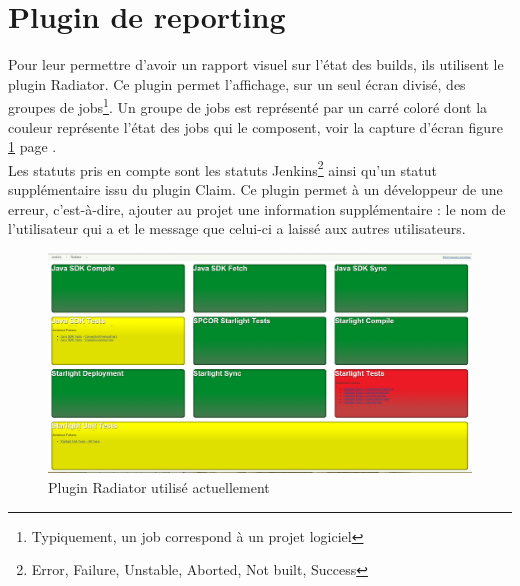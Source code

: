 \section{Plugin de reporting}
Pour leur permettre d'avoir un rapport visuel sur l'état des builds, ils utilisent le plugin Radiator. Ce plugin permet l'affichage, sur un seul écran divisé, des groupes de jobs\footnote{Typiquement, un job correspond à un projet logiciel}. Un groupe de jobs est représenté par un carré coloré dont la couleur représente l'état des jobs qui le composent, voir la capture d'écran figure \ref{figure:radiatorActual} page \pageref{figure:radiatorActual}.\\
Les statuts pris en compte sont les statuts Jenkins\footnote{Error, Failure, Unstable, Aborted, Not built, Success} ainsi qu'un statut supplémentaire issu du plugin Claim. Ce plugin permet à un développeur de  une erreur, c'est-à-dire, ajouter au projet une information supplémentaire : le nom de l'utilisateur qui a  et le message que celui-ci a laissé aux autres utilisateurs.




\begin{figure}[!h]
  \centering
      \includegraphics[width=\textwidth]{images/radiatorActual.png}
  \caption{Plugin Radiator utilisé actuellement}
	\label{figure:radiatorActual}
\end{figure}

